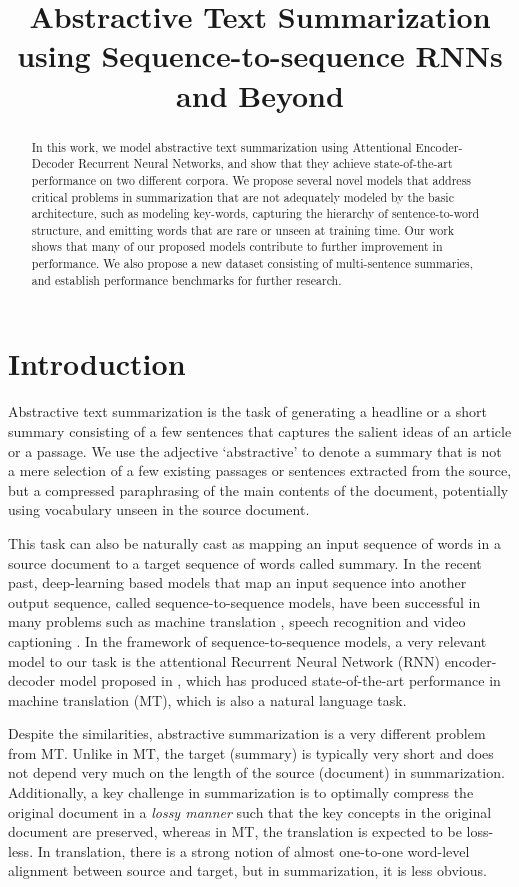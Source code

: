 \title{Abstractive Text Summarization using Sequence-to-sequence RNNs and Beyond}

\begin{abstract}
In this work, we model abstractive text summarization using Attentional Encoder-Decoder Recurrent Neural Networks, and show that they achieve state-of-the-art performance on two different corpora. We propose several novel models that address critical problems in summarization that are not adequately modeled by the basic architecture, such as modeling key-words, capturing the hierarchy of sentence-to-word structure, and emitting words that are rare or unseen at training time. Our work shows that many of our proposed models contribute to further improvement in performance. We also propose a new dataset consisting of multi-sentence summaries, and establish performance benchmarks for further research.
\end{abstract}

\section{Introduction}
Abstractive text summarization is the task of generating a headline or a short summary consisting of a few sentences that captures the salient ideas of an article or a passage. We use the adjective `abstractive' to denote a summary that is not a mere selection of a few existing passages or sentences extracted from the source, but a compressed paraphrasing of the main contents of the document, potentially using vocabulary unseen in the source document. 

This task can also be naturally cast as mapping an input sequence of words in a source document to a target sequence of words called summary. In the recent past, deep-learning based models that map an input sequence into another output sequence, called sequence-to-sequence models, have been successful in many problems such as machine translation \cite{nmt}, speech recognition \cite{speech} and video captioning \cite{video_captioning}. In the framework of sequence-to-sequence models, a very relevant model to our task is the attentional Recurrent Neural Network (RNN) encoder-decoder model proposed in 
, which has produced state-of-the-art performance in machine translation (MT), which is also a natural language task.

Despite the similarities, abstractive summarization is a very different problem from MT. Unlike in MT, the target (summary) is typically very short and does not depend very much on the length of the source (document) in summarization. Additionally, a key challenge in summarization is to optimally compress the original document in a {\it lossy manner} such that the key concepts in the original document are preserved, whereas in MT, the translation is expected to be loss-less. In translation, there is a strong notion of almost one-to-one word-level alignment between source and target, but in summarization, it is less obvious. 

